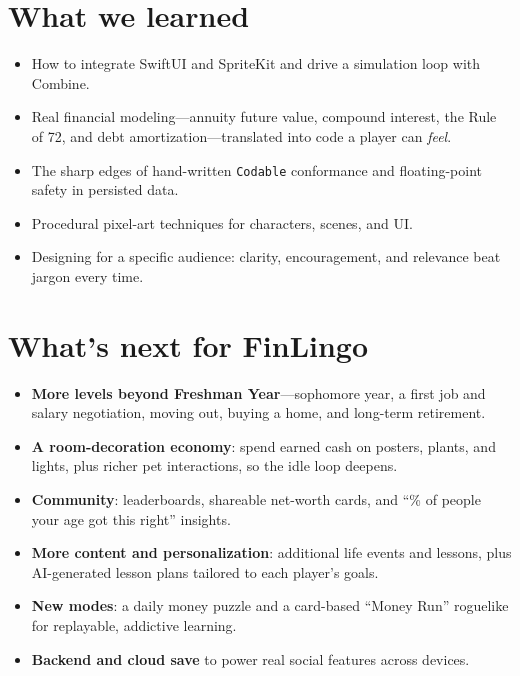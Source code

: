 \documentclass[11pt]{article}
\begin{document}
\section*{What we learned}
\begin{itemize}
  \item How to integrate SwiftUI and SpriteKit and drive a simulation loop with Combine.
  \item Real financial modeling---annuity future value, compound interest, the Rule of
  72, and debt amortization---translated into code a player can \emph{feel}.
  \item The sharp edges of hand-written \texttt{Codable} conformance and floating-point
  safety in persisted data.
  \item Procedural pixel-art techniques for characters, scenes, and UI.
  \item Designing for a specific audience: clarity, encouragement, and relevance beat
  jargon every time.
\end{itemize}

\section*{What's next for FinLingo}
\begin{itemize}
  \item \textbf{More levels beyond Freshman Year}---sophomore year, a first job and
  salary negotiation, moving out, buying a home, and long-term retirement.
  \item \textbf{A room-decoration economy}: spend earned cash on posters, plants, and
  lights, plus richer pet interactions, so the idle loop deepens.
  \item \textbf{Community}: leaderboards, shareable net-worth cards, and ``\% of people
  your age got this right'' insights.
  \item \textbf{More content and personalization}: additional life events and lessons,
  plus AI-generated lesson plans tailored to each player's goals.
  \item \textbf{New modes}: a daily money puzzle and a card-based ``Money Run'' roguelike
  for replayable, addictive learning.
  \item \textbf{Backend and cloud save} to power real social features across devices.
\end{itemize}
\end{document}
